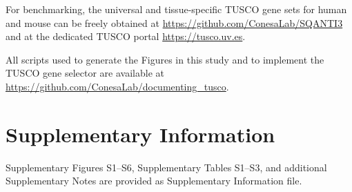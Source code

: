 \documentclass[pdflatex,sn-nature]{sn-jnl}%
\begin{document}
For benchmarking, the universal and tissue-specific TUSCO gene sets for human and mouse can be freely obtained at \url{https://github.com/ConesaLab/SQANTI3} and at the dedicated TUSCO portal \url{https://tusco.uv.es}.

All scripts used to generate the Figures in this study and to implement the TUSCO gene selector are available at \url{https://github.com/ConesaLab/documenting_tusco}.







\newpage
\section*{Supplementary Information}

Supplementary Figures S1--S6, Supplementary Tables S1--S3, and additional Supplementary Notes are provided as Supplementary Information file.
 
\end{document}
